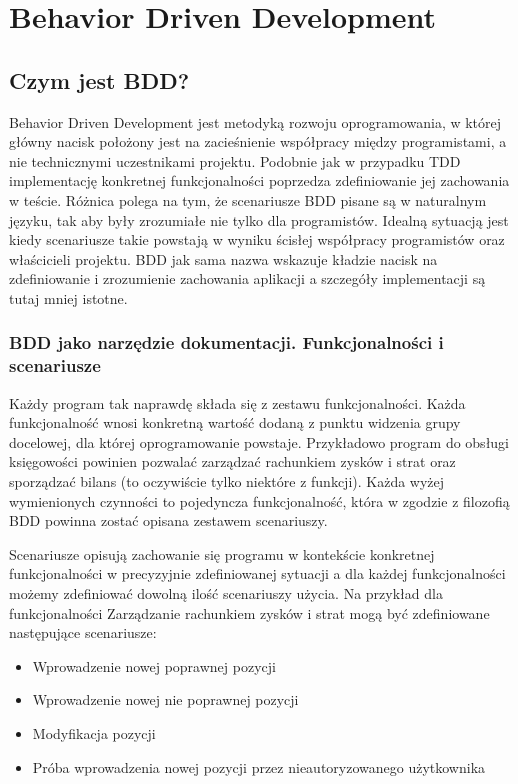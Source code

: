 \chapter[Behavior Driven Development]{Behavior Driven Development}
  \section{Czym jest BDD?}
    Behavior Driven Development jest metodyką rozwoju oprogramowania, w której główny nacisk położony jest na zacieśnienie współpracy między programistami, a nie technicznymi uczestnikami projektu. Podobnie jak w przypadku TDD implementację konkretnej funkcjonalności poprzedza zdefiniowanie jej zachowania w teście. Różnica polega na tym, że scenariusze BDD pisane są w naturalnym języku, tak aby były zrozumiałe nie tylko dla programistów. Idealną sytuacją jest kiedy scenariusze takie powstają w wyniku ścisłej współpracy programistów oraz właścicieli projektu. BDD jak sama nazwa wskazuje kładzie nacisk na zdefiniowanie i zrozumienie zachowania aplikacji a szczegóły implementacji są tutaj mniej istotne.
    \subsection{BDD jako narzędzie dokumentacji. Funkcjonalności i scenariusze}
      Każdy program tak naprawdę składa się z zestawu funkcjonalności. Każda funkcjonalność wnosi konkretną wartość dodaną z punktu widzenia grupy docelowej, dla której oprogramowanie powstaje. Przykładowo program do obsługi księgowości powinien pozwalać zarządzać rachunkiem zysków i strat oraz sporządzać bilans (to oczywiście tylko niektóre z funkcji). Każda wyżej wymienionych czynności to pojedyncza funkcjonalność, która w zgodzie z filozofią BDD powinna zostać opisana zestawem scenariuszy.
      
      Scenariusze opisują zachowanie się programu w kontekście konkretnej funkcjonalności w precyzyjnie zdefiniowanej sytuacji a dla każdej funkcjonalności możemy zdefiniować dowolną ilość scenariuszy użycia. Na przykład dla funkcjonalności Zarządzanie rachunkiem zysków i strat mogą być zdefiniowane następujące scenariusze:
      
      \begin{itemize}
        \item Wprowadzenie nowej poprawnej pozycji
        \item Wprowadzenie nowej nie poprawnej pozycji
        \item Modyfikacja pozycji
        \item Próba wprowadzenia nowej pozycji przez nieautoryzowanego użytkownika
      \end{itemize}
      
